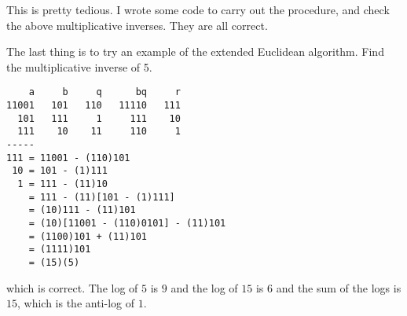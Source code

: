 \documentclass[11pt, oneside]{article}
\begin{document}
This is pretty tedious.  I wrote some code to carry out the procedure, and check the above multiplicative inverses.  They are all correct.

The last thing is to try an example of the extended Euclidean algorithm.  Find the multiplicative inverse of 5.
 
\begin{verbatim}
    a     b     q      bq     r
11001   101   110   11110   111
  101   111     1     111    10
  111    10    11     110     1
-----
111 = 11001 - (110)101
 10 = 101 - (1)111
  1 = 111 - (11)10
    = 111 - (11)[101 - (1)111]
    = (10)111 - (11)101
    = (10)[11001 - (110)0101] - (11)101
    = (1100)101 + (11)101
    = (1111)101
    = (15)(5)
\end{verbatim}
which is correct.  The log of $5$ is $9$ and the log of $15$ is $6$ and the sum of the logs is $15$, which is the anti-log of $1$.
\end{document}
